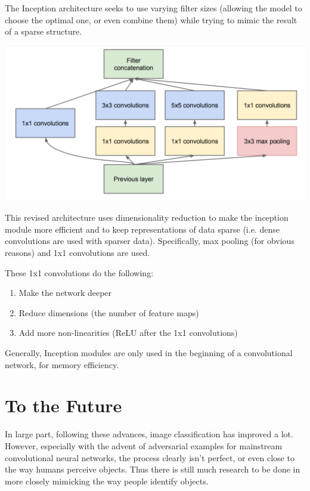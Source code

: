 \documentclass{article}
\begin{document}
    The Inception architecture seeks to use varying filter sizes (allowing the model to choose the optimal one, or even combine them) while trying to mimic the result of a sparse structure. 
    
    \begin{center}
    \includegraphics[scale=0.5]{inception2}
    \end{center}
    
    This revised architecture uses dimensionality reduction to make the inception module more efficient and to keep representations of data sparse (i.e. dense convolutions are used with sparser data). Specifically, max pooling (for obvious reasons) and 1x1 convolutions are used.
    
    These 1x1 convolutions do the following:
    \begin{enumerate}
        \item Make the network deeper
        \item Reduce dimensions (the number of feature maps)
        \item Add more non-linearities (ReLU after the 1x1 convolutions)
    \end{enumerate}
    
    Generally, Inception modules are only used in the beginning of a convolutional network, for memory efficiency. 
    
    

\section{To the Future}
In large part, following these advances, image classification has improved a lot. However, especially with the advent of adversarial examples for mainstream convolutional neural networks, the process clearly isn't perfect, or even close to the way humans perceive objects. Thus there is still much research to be done in more closely mimicking the way people identify objects.
\end{document}
